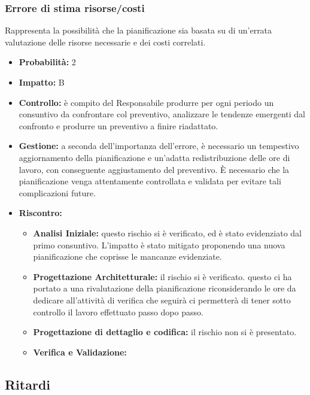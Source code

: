\documentclass[a4paper,11pt]{article}
\begin{document}
		\subsubsection{Errore di stima risorse/costi}
		Rappresenta la possibilità che la pianificazione sia basata su di un'errata valutazione delle risorse necessarie e dei costi correlati.
		\begin{itemize}
		\item \textbf{Probabilità:} 2
		\item \textbf{Impatto:} B
		\item \textbf{Controllo:} è compito del Responsabile produrre per ogni periodo un consuntivo da confrontare col preventivo, analizzare le tendenze emergenti dal confronto e produrre un preventivo a finire riadattato. 
		\item \textbf{Gestione:} a seconda dell'importanza dell'errore, è necessario un tempestivo aggiornamento della pianificazione e un'adatta redistribuzione delle ore di lavoro, con conseguente aggiustamento del preventivo. È necessario che la pianificazione venga attentamente controllata e validata per evitare tali complicazioni future.
		\item \textbf{Riscontro:}
			\begin{itemize}
				\item\textbf{Analisi Iniziale:} questo rischio si è verificato, ed è stato evidenziato dal primo consuntivo. L'impatto è stato mitigato proponendo una nuova pianificazione che coprisse le mancanze evidenziate.
				\item\textbf{Progettazione Architetturale:} il rischio si è verificato. questo ci ha portato a una rivalutazione della pianificazione riconsiderando le ore da dedicare all'attività di verifica che seguirà ci permetterà di tener sotto controllo il lavoro effettuato passo dopo passo.
				\item\textbf{Progettazione di dettaglio e codifica:} il rischio non si è presentato.
				\item\textbf{Verifica e Validazione:}
			\end{itemize}
		\end{itemize}
	\subsection{Ritardi} \label{risk:ritardi }
\end{document}
